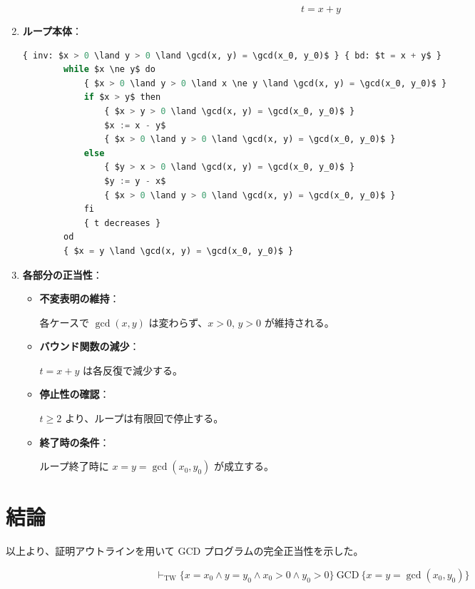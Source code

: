 \documentclass[12pt,a4paper]{article}
\begin{document}
\begin{CJK}{UTF8}{ipxm}
\begin{enumerate}
    \[
    t = x + y
    \]

    \item \textbf{ループ本体}：

    \begin{lstlisting}[language=Python, mathescape=true]
        { inv: $x > 0 \land y > 0 \land \gcd(x, y) = \gcd(x_0, y_0)$ } { bd: $t = x + y$ }
        while $x \ne y$ do
            { $x > 0 \land y > 0 \land x \ne y \land \gcd(x, y) = \gcd(x_0, y_0)$ }
            if $x > y$ then
                { $x > y > 0 \land \gcd(x, y) = \gcd(x_0, y_0)$ }
                $x := x - y$
                { $x > 0 \land y > 0 \land \gcd(x, y) = \gcd(x_0, y_0)$ }
            else
                { $y > x > 0 \land \gcd(x, y) = \gcd(x_0, y_0)$ }
                $y := y - x$
                { $x > 0 \land y > 0 \land \gcd(x, y) = \gcd(x_0, y_0)$ }
            fi
            { t decreases }
        od
        { $x = y \land \gcd(x, y) = \gcd(x_0, y_0)$ }
    \end{lstlisting}
        

    \item \textbf{各部分の正当性}：

    \begin{itemize}
        \item \textbf{不変表明の維持}：

        各ケースで \(\gcd(x, y)\) は変わらず、\( x > 0 \), \( y > 0 \) が維持される。

        \item \textbf{バウンド関数の減少}：

        \( t = x + y \) は各反復で減少する。

        \item \textbf{停止性の確認}：

        \( t \geq 2 \) より、ループは有限回で停止する。

        \item \textbf{終了時の条件}：

        ループ終了時に \( x = y = \gcd(x_0, y_0) \) が成立する。
    \end{itemize}

\end{enumerate}

\section*{結論}

以上より、証明アウトラインを用いて GCD プログラムの完全正当性を示した。

\[
\vdash_{\text{TW}} \{ x = x_0 \land y = y_0 \land x_0 > 0 \land y_0 > 0 \} \ \text{GCD} \ \{ x = y = \gcd(x_0, y_0) \}
\]

\end{CJK}
\end{document}
